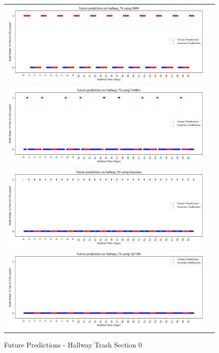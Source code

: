 \begin{figure}[!Hp]
  \begin{tabular}{cc}
    {\includegraphics[width = 6in]{images/results/Future_hallway_T0_DMM.png}} \\
    {\includegraphics[width = 6in]{images/results/Future_hallway_T0_FreMEn.png}} \\
    {\includegraphics[width = 6in]{images/results/Future_hallway_T0_Gaussian.png}} \\
    {\includegraphics[width = 6in]{images/results/Future_hallway_T0_HyT-EM.png}} \\
  \end{tabular}
  \caption{Future Predictions - Hallway Trash Section 0}
\end{figure}

